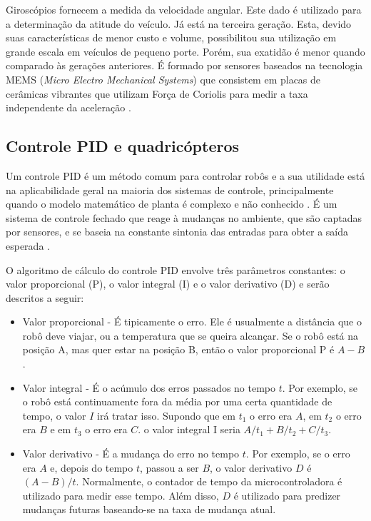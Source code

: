 \documentclass[a4paper, 12pt]{article}
\begin{document}
Giroscópios fornecem a medida da velocidade angular. Este dado é utilizado para a determinação da atitude do veículo. Já está na terceira geração. Esta, devido suas características de menor custo e volume, possibilitou sua utilização em grande escala em veículos de pequeno porte. Porém, sua exatidão é menor quando comparado às gerações anteriores. É formado por sensores baseados na tecnologia MEMS (\textit{Micro Electro Mechanical Systems}) que consistem em placas de cerâmicas vibrantes que utilizam Força de Coriolis para medir a taxa independente da aceleração \cite{Adalberto2009}.

\subsection{Controle PID e quadricópteros}

\label{subsec:PID}

Um controle PID é um método comum para controlar robôs e a sua utilidade está na aplicabilidade geral na maioria dos sistemas de controle, principalmente quando o modelo matemático de planta é complexo e não conhecido \cite{Ogata2003}. É um sistema de controle fechado que reage à mudanças no ambiente, que são captadas por sensores, e se baseia na constante sintonia das entradas para obter a saída esperada \cite{Kingdom}.  

O algoritmo de cálculo do controle PID envolve três parâmetros constantes: o valor proporcional (P), o valor integral (I) e o valor derivativo (D) e serão descritos a seguir:

\begin{itemize}
\item
Valor proporcional - É tipicamente o erro. Ele é usualmente a distância que o robô deve viajar, ou a temperatura que se queira alcançar. Se o robô está na posição A, mas quer estar na posição B, então o valor proporcional P é $A - B$.
\item
Valor integral - É o acúmulo dos erros passados no tempo $t$. Por exemplo, se o robô está continuamente fora da média por uma certa quantidade de tempo, o valor $I$ irá tratar isso. Supondo que em $t_1$ o erro era $A$, em $t_2$ o erro era $B$ e em $t_3$ o erro era $C$. o valor integral I seria $A/t_1 + B/t_2 + C/t_3$.
\item
Valor derivativo - É a mudança do erro no tempo $t$. Por exemplo, se o erro era $A$ e, depois do tempo $t$, passou a ser $B$, o valor derivativo $D$ é $(A-B)/t$. Normalmente, o contador de tempo da microcontroladora é utilizado para medir esse tempo. Além disso, $D$ é utilizado para predizer mudanças futuras baseando-se na taxa de mudança atual.
\end{itemize}
\end{document}
